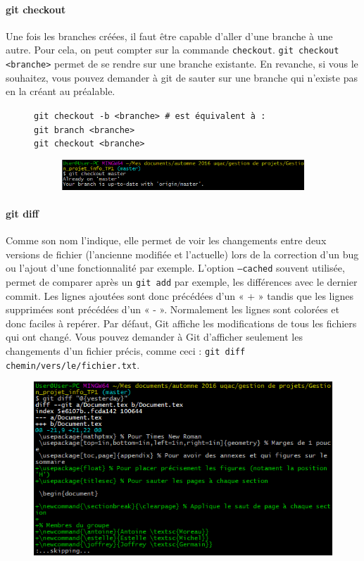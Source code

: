 \documentclass[11pt,canadien]{article}
\begin{document}
\paragraph{git checkout}Une fois les branches créées, il faut être capable d'aller d'une branche à une autre. Pour cela, on peut compter sur la commande \texttt{checkout}. \texttt{git checkout <branche>} permet de se rendre sur une branche existante. En revanche, si vous le souhaitez, vous pouvez demander à git de sauter sur une branche qui n'existe pas en la créant au préalable.
\begin{figure}[H]
	\texttt{git checkout -b <branche> \# est équivalent à : \\
		    git branch <branche> \\
			git checkout <branche>}
	\begin{figure}[H]
		\centering
		\includegraphics{images/git_checkout.png}
	\end{figure}
\end{figure}

\paragraph{git diff}Comme son nom l’indique, elle permet de voir les changements entre deux versions de fichier (l’ancienne modifiée et l’actuelle) lors de la correction d’un bug ou l’ajout d’une fonctionnalité par exemple. L'option \texttt{--cached} souvent utilisée, permet de comparer après un \texttt{git add} par exemple, les différences avec le dernier commit. Les lignes ajoutées sont donc précédées d’un « + » tandis que les lignes supprimées sont précédées d’un « - ». Normalement les lignes sont colorées et donc faciles à repérer. Par défaut, Git affiche les modifications de tous les fichiers qui ont changé. Vous pouvez demander à Git d’afficher seulement les changements d’un fichier précis, comme ceci : \texttt{git diff chemin/vers/le/fichier.txt}.
\begin{figure}[H]
	\centering
	\includegraphics{images/git_diff.png}
\end{figure}
\end{document}
